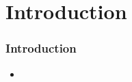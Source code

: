 \section{Introduction}

\begin{frame}
	\frametitle{Introduction}
	\begin{itemize}
		\item
	\end{itemize}
\end{frame}
